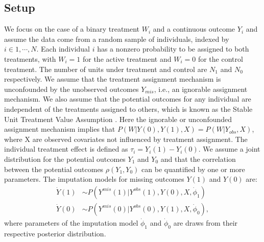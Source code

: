 	\subsection{Setup}  
	We focus on the case of a binary treatment $W_{i}$ and a continuous outcome $Y_{i}$ and assume the data come from a random sample of individuals, indexed by $i \in {1,\cdots,N}$. Each individual $i$ has a nonzero probability to be assigned to both treatments, with $W_{i} = 1$ for the active treatment and $W_{i} = 0$ for the control treatment. The number of units under treatment and control are $N_{1}$ and $N_{0}$ respectively. We assume that the treatment assignment mechanism is unconfounded by the unobserved outcomes $Y_{mis}$, i.e., an ignorable assignment mechanism. We also assume that the potential outcomes for any individual are independent of the treatments assigned to others, which is known as the Stable Unit Treatment Value Assumption \citep{imbens2015causal}. Here the ignorable or unconfounded assignment mechanism implies that $P(W|Y(0), Y(1), X) = P(W|Y_{obs}, X)$, where X are observed covariates not influenced by treatment assignment. The individual treatment effect is defined as $\tau_{i} = Y_{i}(1) - Y_{i}(0)$. We assume a joint distribution for the potential outcomes $Y_{1}$ and $Y_{0}$ and that the correlation between the potential outcomes $\rho(Y_{1}, Y_{0})$ can be quantified by one or more parameters. The imputation models for missing outcomes $Y(1)$ and $Y(0)$ are: 
	\begin{align}
		\dot{Y}(1) &\sim P(Y^{mis}(1)|Y^{obs}(1), Y(0), X, \dot{\phi}_{1})\\
		\dot{Y}(0) &\sim P(Y^{mis}(0)|Y^{obs}(0), Y(1), X, \dot{\phi}_{0}),
	\end{align}
	where parameters of the imputation model $\dot{\phi}_{1}$ and $\dot{\phi}_{0}$ are draws from their respective posterior distribution.
